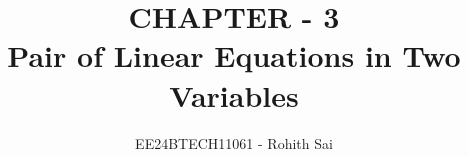 \documentclass[journal]{IEEEtran}
\begin{document}

\vspace{3cm}

\title{CHAPTER - 3\\Pair of Linear Equations in Two Variables}
\author{EE24BTECH11061 - Rohith Sai}
{\let\newpage\relax\maketitle}

\renewcommand{\thefigure}{\theenumi}
\renewcommand{\thetable}{\theenumi}
\setlength{\intextsep}{10pt} %

\renewcommand{\thetable}{\theenumi}
\end{document}
